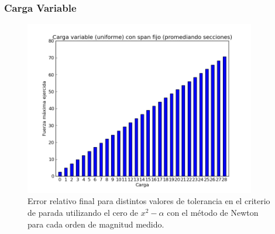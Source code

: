 \subsubsection{Carga Variable}

\begin{figure}[H]
  \centering
    \includegraphics[width=0.9\textwidth]{../mediciones/cargaVariable.png}
    \caption{Error relativo final para distintos valores de tolerancia en el criterio de parada utilizando el cero de $x^2-\alpha$ con el método de Newton para cada orden de magnitud medido.}
\end{figure}